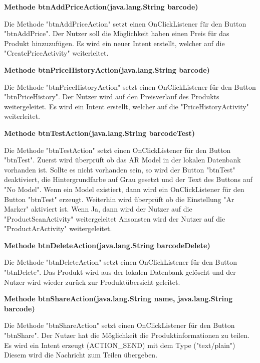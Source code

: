 \documentclass{scrartcl}
\begin{document}
\noindent\textbf{Methode btnAddPriceAction(java.lang.String barcode)} 

\noindent Die Methode "btnAddPriceAction" setzt einen OnClickListener für den Button "btnAddPrice". Der Nutzer soll die Möglichkeit haben einen Preis für das Produkt hinzuzufügen. Es wird ein neuer Intent erstellt, welcher auf die "CreatePriceActivity" weiterleitet. \newline

\noindent\textbf{Methode btnPriceHistoryAction(java.lang.String barcode)} 

\noindent Die Methode "btnPriceHistoryAction" setzt einen OnClickListener für den Button "btnPriceHistory". Der Nutzer wird auf den Preisverlauf des Produkts weitergeleitet. Es wird ein Intent erstellt, welcher auf die "PriceHistoryActivity" weiterleitet. \newline

\noindent\textbf{Methode btnTestAction(java.lang.String barcodeTest)} 

\noindent Die Methode "btnTestAction" setzt einen OnClickListener für den Button "btnTest". Zuerst wird überprüft ob das AR Model in der lokalen Datenbank vorhanden ist. Sollte es nicht vorhanden sein, so wird der Button "btnTest" deaktiviert, die Hintergrundfarbe auf Grau gesetzt und der Text des Buttons auf "No Model". Wenn ein Model existiert, dann wird ein OnClickListener für den Button "btnTest" erzeugt. Weiterhin wird überprüft ob die Einstellung "Ar Marker" aktiviert ist. Wenn Ja, dann wird der Nutzer auf die "ProductScanActivity" weitergeleitet Ansonsten wird der Nutzer auf die "ProductArActivity" weitergeleitet. \newline

\noindent\textbf{Methode btnDeleteAction(java.lang.String barcodeDelete)} 

\noindent Die Methode "btnDeleteAction" setzt einen OnClickListener für den Button "btnDelete". Das Produkt wird aus der lokalen Datenbank gelöscht und der Nutzer wird wieder zurück zur Produktübersicht geleitet. \newline

\noindent\textbf{Methode btnShareAction(java.lang.String name, java.lang.String barcode)} 

\noindent Die Methode "btnShareAction" setzt einen OnClickListener für den Button "btnShare". Der Nutzer hat die Möglichkeit die Produktinformationen zu teilen. Es wird ein Intent erzeugt (ACTION\_SEND) mit dem Type ("text/plain") Diesem wird die Nachricht zum Teilen übergeben. \newline 
\end{document}
